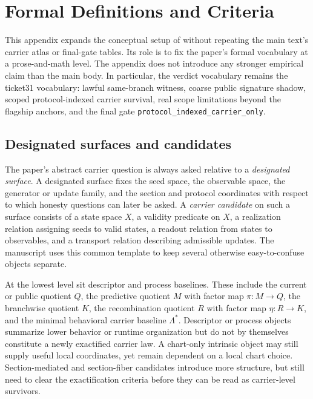 \documentclass[11pt]{article}
\theoremstyle{definition}
\begin{document}
\appendix
\section{Formal Definitions and Criteria}
\label{app:formal-definitions-and-theorem-statements}

This appendix expands the conceptual setup of
 without repeating the main text's
carrier atlas or final-gate tables. Its role is to fix the paper's formal vocabulary at a
prose-and-math level. The appendix does not introduce any stronger empirical claim than
the main body. In particular, the verdict vocabulary remains the ticket31 vocabulary:
lawful same-branch witness, coarse public signature shadow, scoped protocol-indexed
carrier survival, real scope limitations beyond the flagship anchors, and the final gate
\texttt{protocol\_indexed\_carrier\_only}.

\subsection{Designated surfaces and candidates}

The paper's abstract carrier question is always asked relative to a \emph{designated
surface}. A designated surface fixes the seed space, the observable space, the generator
or update family, and the section and protocol coordinates with respect to which honesty
questions can later be asked. A \emph{carrier candidate} on such a surface consists of a
state space \(X\), a validity predicate on \(X\), a realization relation assigning seeds
to valid states, a readout relation from states to observables, and a transport relation
describing admissible updates. The manuscript uses this common template to keep several
otherwise easy-to-confuse objects separate.

At the lowest level sit descriptor and process baselines. These include the current or
public quotient \(Q\), the predictive quotient \(M\) with factor map \(\pi : M \to Q\),
the branchwise quotient \(K\), the recombination quotient \(R\) with factor map
\(\eta : R \to K\), and the minimal behavioral carrier baseline \(\Lambda^\ast\).
Descriptor or process objects summarize lower behavior or runtime organization but do not
by themselves constitute a newly exactified carrier law. A chart-only intrinsic object may
still supply useful local coordinates, yet remain dependent on a local chart choice.
Section-mediated and section-fiber candidates introduce more structure, but still need to
clear the exactification criteria before they can be read as carrier-level survivors.
\end{document}
